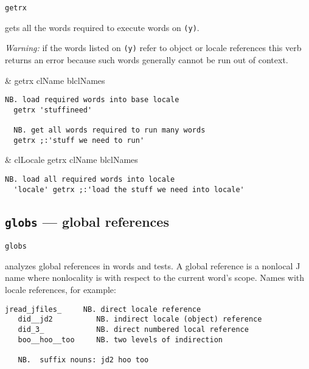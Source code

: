 \hypertarget{il:getrx}{\texttt{getrx}} gets all the words required to execute words on \texttt{(y)}.
 
\emph{Warning:}  if  the words listed on  \texttt{(y)} refer to  object  or 
locale references  this verb  returns  
an error because such words 
generally cannot be run out of context.

\begin{wordhead}
\monad & getrx clName \argsep blclNames \\
\end{wordhead}
\begin{lstlisting}[frame=single,framerule=0pt] 
  NB. load required words into base locale
  getrx 'stuffineed'       

  NB. get all words required to run many words 
  getrx ;:'stuff we need to run' 
\end{lstlisting}

\begin{wordhead}
\dyad & clLocale getrx clName \argsep blclNames \\
\end{wordhead}
\begin{lstlisting}[frame=single,framerule=0pt] 
  NB. load all required words into locale
  'locale' getrx ;:'load the stuff we need into locale' 
\end{lstlisting}


\subsection{\texttt{globs} --- global references}\label{ss:globs}

\hypertarget{il:globs}{\texttt{globs}} analyzes 
global references 
in words and tests. A global reference is a 
nonlocal J name where nonlocality is with respect to the current word's scope. 
Names with locale references, for example: 

\begin{lstlisting}[frame=single,framerule=0pt] 
   jread_jfiles_     NB. direct locale reference
   did__jd2          NB. indirect locale (object) reference 
   did_3_            NB. direct numbered local reference
   boo__hoo__too     NB. two levels of indirection 
   
   NB.  suffix nouns: jd2 hoo too
\end{lstlisting}
  
 

